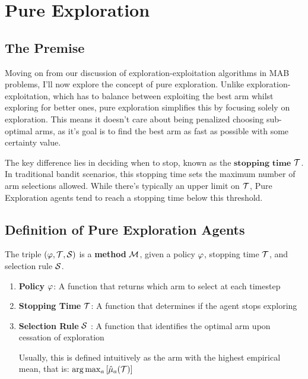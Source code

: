 \chapter{Pure Exploration}
\label{cha:pureexploration}

\section{The Premise}
\label{sec:premise}
Moving on from our discussion of exploration-exploitation algorithms in MAB problems, I'll now explore the concept of pure exploration. Unlike exploration-exploitation, which has to balance between exploiting the best arm whilst exploring for better ones, pure exploration simplifies this by focusing solely on exploration. This means it doesn't care about being penalized choosing sub-optimal arms, as it's goal is to find the best arm as fast as possible with some certainty value.

The key difference lies in deciding when to stop, known as the $\textbf{stopping time}$ $\mathcal{T}$. In traditional bandit scenarios, this stopping time sets the maximum number of arm selections allowed. While there's typically an upper limit on $\mathcal{T}$, Pure Exploration agents tend to reach a stopping time below this threshold.

\section{Definition of Pure Exploration Agents}

\begin{definition}\label{def:method}
The triple $(\varphi, \mathcal{T}, \mathcal{S})$ is a \textbf{method} $\mathcal{M}$, given a policy $\varphi$, stopping time $\mathcal{T}$, and selection rule $\mathcal{S}$.

\begin{enumerate}
    \item \textbf{Policy} $\varphi$: A function that returns which arm to select at each timestep
    
    \item \textbf{Stopping Time} $\mathcal{T}$: A function that determines if the agent stops exploring
    
    \item \textbf{Selection Rule} $\mathcal{S}$ : A function that identifies the optimal arm upon cessation of exploration

    Usually, this is defined intuitively as the arm with the highest empirical mean, that is: $ \arg\max_{a}\left[\hat{\mu}_{a}(\mathcal{T})\right]$
    
\end{enumerate}
\end{definition}


